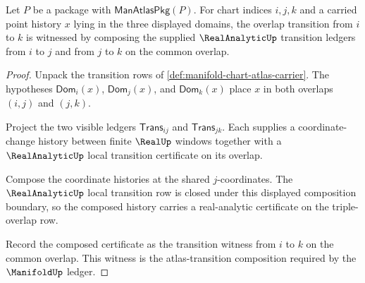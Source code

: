 \begin{theorem}
\label{thm:manifoldup-atlas-transition-composition}
Let $P$ be a package with $\mathsf{ManAtlasPkg}(P)$. For chart indices
$i,j,k$ and a carried point history $x$ lying in the three displayed domains,
the overlap transition from $i$ to $k$ is witnessed by composing the supplied
$\RealAnalyticUp$ transition ledgers from $i$ to $j$ and from $j$ to $k$ on the
common overlap.
\end{theorem}
\begin{proof}
Unpack the transition rows of
\autoref{def:manifold-chart-atlas-carrier}. The hypotheses
$\mathsf{Dom}_i(x)$, $\mathsf{Dom}_j(x)$, and $\mathsf{Dom}_k(x)$ place $x$ in
both overlaps $(i,j)$ and $(j,k)$.

Project the two visible ledgers $\mathsf{Trans}_{ij}$ and
$\mathsf{Trans}_{jk}$. Each supplies a coordinate-change history between finite
$\RealUp$ windows together with a $\RealAnalyticUp$ local transition
certificate on its overlap.

Compose the coordinate histories at the shared $j$-coordinates. The
$\RealAnalyticUp$ local transition row is closed under this displayed
composition boundary, so the composed history carries a real-analytic
certificate on the triple-overlap row.

Record the composed certificate as the transition witness from $i$ to $k$ on
the common overlap. This witness is the atlas-transition composition required
by the $\ManifoldUp$ ledger.
\end{proof}

